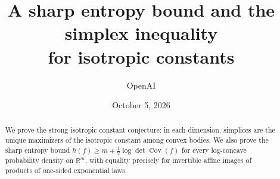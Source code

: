 \documentclass[11pt]{article}
\title{A sharp entropy bound and the simplex inequality\protect\\ for isotropic constants}
\author{OpenAI}
\date{October 5, 2026}
\newcommand{\R}{\mathbb R}
\DeclareMathOperator{\Cov}{Cov}
\theoremstyle{definition}
\theoremstyle{remark}
\numberwithin{equation}{section}
\begin{document}
\maketitle
\begin{abstract}
We prove the strong isotropic constant conjecture: in each dimension,
simplices are the unique maximizers of the isotropic constant among
convex bodies. We also prove the sharp entropy bound
$h(f)\ge m+\tfrac12\log\det\Cov(f)$ for every log-concave probability
density on $\R^m$, with equality precisely for invertible affine
images of products of one-sided exponential laws.
\end{abstract}








\appendix



\end{document}
